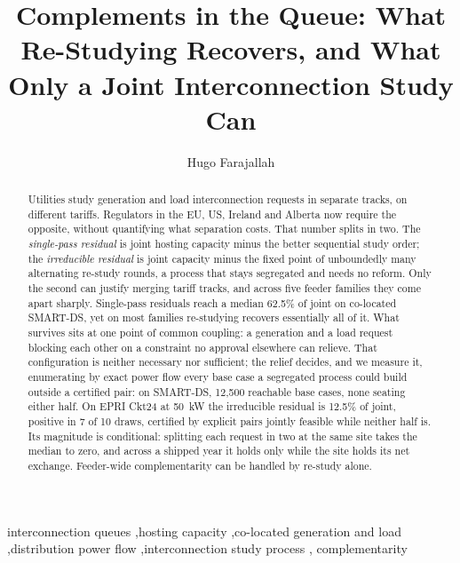 \documentclass[review,authoryear,12pt]{elsarticle}
\begin{document}
\begin{frontmatter}

\title{Complements in the Queue: What Re-Studying Recovers, and What Only a
Joint Interconnection Study Can}

\author{Hugo Farajallah}
\address{Independent Research}

\begin{abstract}
Utilities study generation and load interconnection requests in separate
tracks, on different tariffs. Regulators in the EU, US, Ireland and Alberta now
require the opposite, without quantifying what separation costs. That number
splits in two. The \emph{single-pass residual} is joint hosting capacity minus
the better sequential study order; the \emph{irreducible residual} is joint
capacity minus the fixed point of unboundedly many alternating re-study rounds,
a process that stays segregated and needs no reform. Only the second can
justify merging tariff tracks, and across five feeder families they come apart
sharply. Single-pass residuals reach a median 62.5\% of joint on co-located
SMART-DS, yet on most families re-studying recovers essentially all of it. What
survives sits at one point of common coupling: a generation and a load request
blocking each other on a constraint no approval elsewhere can
relieve. That configuration is neither necessary nor sufficient; the relief
decides, and we measure it, enumerating by exact power
flow every base case a segregated process could build outside a certified
pair: on SMART-DS, 12{,}500 reachable base cases, none seating either half. On
EPRI Ckt24 at 50~kW the irreducible residual is 12.5\% of joint, positive in 7
of 10 draws, certified by explicit pairs jointly feasible while neither half
is. Its magnitude is conditional: splitting each request in two at the same
site takes the median to zero, and across a shipped year it holds only while
the site holds its net exchange. Feeder-wide complementarity can be handled by
re-study alone.
\end{abstract}

\begin{keyword}
interconnection queues \sep hosting capacity \sep co-located generation and
load \sep distribution power flow \sep interconnection study process \sep
complementarity
\end{keyword}

\end{frontmatter}
\end{document}
